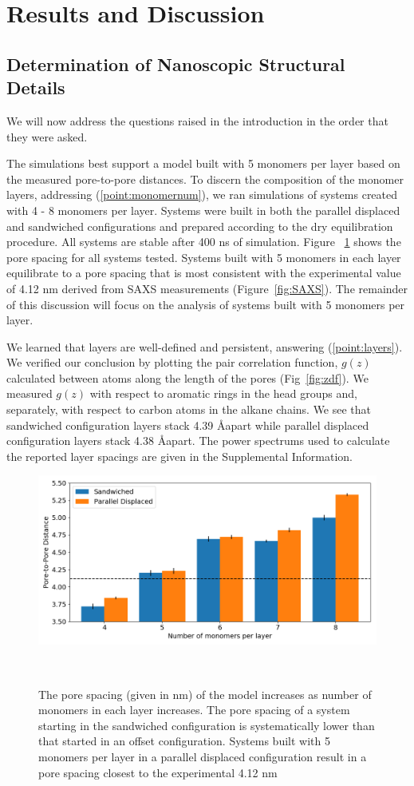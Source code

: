\documentclass{article}
\newcommand{\angstrom}{\textup{\AA}}
\begin{document}
  \section*{Results and Discussion}
  
  \subsection*{Determination of Nanoscopic Structural Details}
  
  We will now address the questions raised in the introduction in the order
  that they were asked.  %

  The simulations best support a model built with 5 monomers per layer based on
  the measured pore-to-pore distances. To discern the composition of the monomer
  layers, addressing (\ref{point:monomernum}), we ran simulations of systems
  created with 4 - 8 monomers per layer. Systems were built in both the parallel
  displaced and sandwiched configurations and prepared according to
  the dry equilibration procedure. All systems are stable after 400 ns of
  simulation. Figure ~\ref{fig:p2p} shows the pore spacing for all systems
  tested. Systems built with 5 monomers in each layer equilibrate to a pore
  spacing that is most consistent with the experimental value of 4.12 nm derived
  from SAXS measurements (Figure~\ref{fig:SAXS}). The remainder of this
  discussion will focus on the analysis of systems built with 5 monomers per
  layer.

  We learned that layers are well-defined and persistent, answering
  (\ref{point:layers}). We verified our conclusion by plotting the pair
  correlation function, $g(z)$ calculated between atoms along the length of the
  pores (Fig~\ref{fig:zdf}). We measured $g(z)$ with respect to aromatic rings in
  the head groups and, separately, with respect to carbon atoms in the alkane
  chains. We see that sandwiched configuration layers stack 4.39 \angstrom apart
  while parallel displaced configuration layers stack 4.38 \angstrom apart.  The
  power spectrums used to calculate the reported layer spacings are given in the
  Supplemental Information.

 \begin{figure}
	\centering
	\includegraphics[width=0.5\linewidth]{p2p.png}
	\caption{The pore spacing (given in nm) of the model increases as
	number of monomers in each layer increases. The pore spacing of a system
	starting in the sandwiched configuration is systematically lower than 
	that started in an offset configuration. Systems built with 5 monomers
	per layer in a parallel displaced configuration result in a pore spacing
	closest to the experimental 4.12 nm}~\label{fig:p2p}
  \end{figure}  
\end{document}
